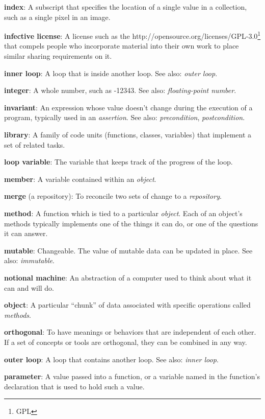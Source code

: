 \documentclass[]{book}
\newcommand{\urlfoot}[2]{{#1}\footnote{#2}}
\newcommand{\gdef}[2]{\emph{#2}}
\begin{document}
\textbf{index}: A subscript that specifies the location of a single
value in a collection, such as a single pixel in an image.

\textbf{infective license}: A license such as the
\urlfoot{http://opensource.org/licenses/GPL-3.0}{GPL} that compels people
who incorporate material into their own work to place similar sharing
requirements on it.

\textbf{inner loop}: A loop that is inside another loop. See also:
\gdef{g:outer-loop}{outer loop}.

\textbf{integer}: A whole number, such as -12343. See also:
\gdef{g:float}{floating-point number}.

\textbf{invariant}: An expression whose value doesn't change during the
execution of a program, typically used in an
\gdef{g:assertion}{assertion}. See also:
\gdef{g:precondition}{precondition},
\gdef{g:postcondition}{postcondition}.

\textbf{library}: A family of code units (functions, classes, variables)
that implement a set of related tasks.

\textbf{loop variable}: The variable that keeps track of the progress of
the loop.

\textbf{member}: A variable contained within an
\gdef{g:object}{object}.

\textbf{merge} (a repository): To reconcile two sets of change to a
\gdef{g:repository}{repository}.

\textbf{method}: A function which is tied to a particular
\gdef{g:object}{object}. Each of an object's methods typically
implements one of the things it can do, or one of the questions it can
answer.

\textbf{mutable}: Changeable. The value of mutable data can be updated
in place. See also: \gdef{g:immutable}{immutable}.

\textbf{notional machine}: An abstraction of a computer used to think
about what it can and will do.

\textbf{object}: A particular ``chunk'' of data associated with specific
operations called \gdef{g:method}{methods}.

\textbf{orthogonal}: To have meanings or behaviors that are independent
of each other. If a set of concepts or tools are orthogonal, they can be
combined in any way.

\textbf{outer loop}: A loop that contains another loop. See also:
\gdef{g:inner-loop}{inner loop}.

\textbf{parameter}: A value passed into a function, or a variable named
in the function's declaration that is used to hold such a value.
\end{document}
